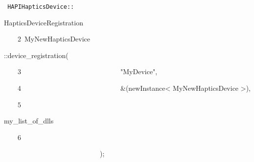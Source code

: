 {
\tt
{HAPIHapticsDevice}{\hlsym ::}{\hlstd HapticsDeviceRegistration\leavevmode\par
{\hlline \ \ \ \ 2\ }MyNewHapticsDevice}{\hlsym ::}{\hlstd }{\hlkwd device\_{}registration}{\hlstd }{\hlsym (}\leavevmode\par
{\hlline \ \ \ \ 3\ }{\hlstd }{\hlstd\ \ \ \ \ \ \ \ \ \ \ \ \ \ \ \ \ \ \ \ \ \ \ \ \ \ \ \ }{\hlstd }{\hlstr "MyDevice"}{\hlstd }{\hlsym ,}\leavevmode\par
{\hlline \ \ \ \ 4\ }{\hlstd }{\hlstd\ \ \ \ \ \ \ \ \ \ \ \ \ \ \ \ \ \ \ \ \ \ \ \ \ \ \ \ }{\hlstd }{\hlsym \&(}{\hlstd newInstance}{\hlsym $\mathord{<}$ }{\hlstd MyNewHapticsDevice }{\hlsym $\mathord{>}$),}\leavevmode\par
{\hlline \ \ \ \ 5\ }{\hlstd }{\hlstd\ \ \ \ \ \ \ \ \ \ \ \ \ \ \ \ \ \ \ \ \ \ \ \ \ \ \ \ }{\hlstd my\_{}list\_{}of\_{}dlls\leavevmode\par
{\hlline \ \ \ \ 6\ }}{\hlstd\ \ \ \ \ \ \ \ \ \ \ \ \ \ \ \ \ \ \ \ \ \ \ \ \ \ \ \ }{\hlstd }{\hlsym );}{\hlstd }\leavevmode\par
}
